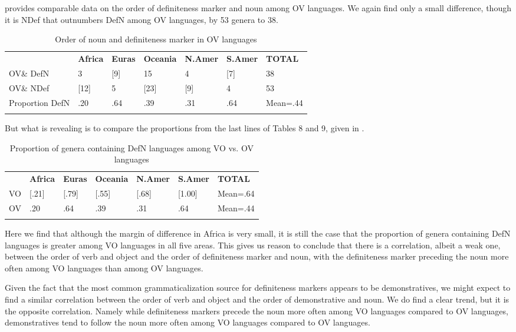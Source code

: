 \documentclass[output=paper]{langsci/langscibook}
\begin{document}
 provides comparable data on the order of definiteness marker and noun among OV languages.  We again find only a small difference, though it is NDef that outnumbers DefN among OV languages, by 53 genera to 38.

\begin{table}
\begin{tabularx}{\textwidth}{XXXXXXX} & \bfseries Africa & \bfseries Euras & \bfseries Oceania & \bfseries N.Amer & \bfseries S.Amer & \bfseries TOTAL\\
\lsptoprule
OV\& DefN & 3 & [9] & 15 & 4 & [7] & 38\\
OV\& NDef & [12] & 5 & [23] & [9] & 4 & 53\\
Proportion DefN & .20 & .64 & .39 & .31 & .64 & Mean=.44\\
\lspbottomrule
\end{tabularx}

\caption{Order of noun and definiteness marker in OV languages}
\label{tab:dryer:9}
\end{table}

But what is revealing is to compare the proportions from the last lines of Tables 8 and 9, given in .

\begin{table}
\begin{tabularx}{\textwidth}{XXXXXXX} & \bfseries Africa & \bfseries Euras & \bfseries Oceania & \bfseries N.Amer & \bfseries S.Amer & \bfseries TOTAL\\
\lsptoprule
VO & [.21] & [.79] & [.55] & [.68] & [1.00] & Mean=.64\\
OV & .20 & .64 & .39 & .31 & .64 & Mean=.44\\
\lspbottomrule
\end{tabularx}
\caption{\label{tab:dryer:10} Proportion of genera containing DefN languages among VO vs. OV languages}
\end{table}


Here we find that although the margin of difference in Africa is very small, it is still the case that the proportion of genera containing DefN languages is greater among VO languages in all five areas. This gives us reason to conclude that there is a correlation, albeit a weak one, between the order of verb and object and the order of definiteness marker and noun, with the definiteness marker preceding the noun more often among VO languages than among OV languages.

Given the fact that the most common grammaticalization source for definiteness markers appears to be demonstratives, we might expect to find a similar correlation between the order of verb and object and the order of demonstrative and noun. We do find a clear trend, but it is the opposite correlation. Namely while definiteness markers precede the noun more often among VO languages compared to OV languages, demonstratives tend to follow the noun more often among VO languages compared to OV languages.
\end{document}
